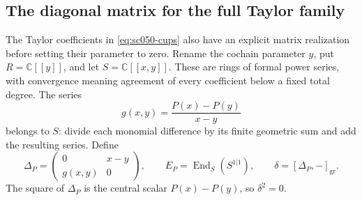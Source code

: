 \subsection{The diagonal matrix for the full Taylor family}

The Taylor coefficients in \eqref{eq:sc050-cups} also have an
explicit matrix realization before setting their parameter to zero.
Rename the cochain parameter \(y\), put \(R=\mathbb C[[y]]\), and
let \(S=\mathbb C[[x,y]]\). These are rings of formal power series,
with convergence meaning agreement of every coefficient below a
fixed total degree. The series
\[
 g(x,y)=\frac{P(x)-P(y)}{x-y}
\]
belongs to \(S\): divide each monomial difference by its finite
geometric sum and add the resulting series. Define
\[
 \Delta_P=\begin{pmatrix}0&x-y\\g(x,y)&0\end{pmatrix},
 \qquad E_P=\operatorname{End}_S(S^{1|1}),\qquad
 \delta=[\Delta_P,-]_{\mathrm{gr}}.
\]
The square of \(\Delta_P\) is the central scalar \(P(x)-P(y)\),
so \(\delta^2=0\).

